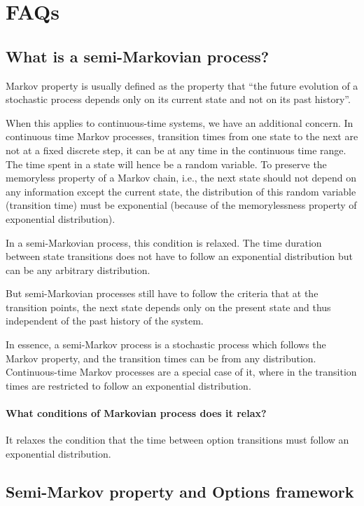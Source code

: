 \section{FAQs}

\subsection{What is a semi-Markovian process?}

Markov property is usually defined as the property that ``the future evolution of a stochastic process depends only on its current state and not on its past history''.

When this applies to continuous-time systems, we have an additional concern.
In continuous time Markov processes, transition times from one state to the next are not at a fixed discrete step, it can be at any time in the continuous time range.
The time spent in a state will hence be a random variable.
To preserve the memoryless property of a Markov chain, i.e., the next state should not depend on any information except the current state, the distribution of this random variable (transition time) must be exponential (because of the memorylessness property of exponential distribution).

In a semi-Markovian process, this condition is relaxed.
The time duration between state transitions does not have to follow an exponential distribution but can be any arbitrary distribution.

But semi-Markovian processes still have to follow the criteria that at the transition points, the next state depends only on the present state and thus independent of the past history of the system.

In essence, a semi-Markov process is a stochastic process which follows the Markov property, and the transition times can be from any distribution.
Continuous-time Markov processes are a special case of it, where in the transition times are restricted to follow an exponential distribution.

\paragraph{What conditions of Markovian process does it relax?}

It relaxes the condition that the time between option transitions must follow an exponential distribution.

\subsection{Semi-Markov property and Options framework}

